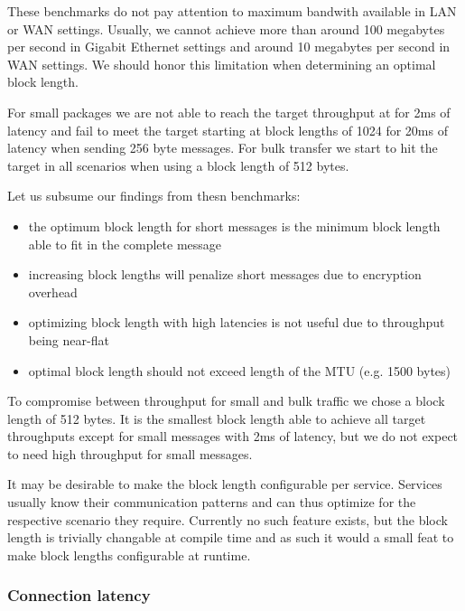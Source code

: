 \medskip

These benchmarks do not pay attention to maximum bandwith available in LAN or WAN settings.
Usually, we cannot achieve more than around 100 megabytes per second in Gigabit Ethernet settings and around 10 megabytes per second in WAN settings.
We should honor this limitation when determining an optimal block length.

For small packages we are not able to reach the target throughput at for 2ms of latency and fail to meet the target starting at block lengths of 1024 for 20ms of latency when sending 256 byte messages.
For bulk transfer we start to hit the target in all scenarios when using a block length of 512 bytes.

\medskip

Let us subsume our findings from thesn benchmarks:
\begin{itemize}
    \item the optimum block length for short messages is the minimum block length able to fit in the complete message
    \item increasing block lengths will penalize short messages due to encryption overhead
    \item optimizing block length with high latencies is not useful due to throughput being near-flat
    \item optimal block length should not exceed length of the MTU (e.g. 1500 bytes)
\end{itemize}

To compromise between throughput for small and bulk traffic we chose a block length of 512 bytes.
It is the smallest block length able to achieve all target throughputs except for small messages with 2ms of latency, but we do not expect to need high throughput for small messages.

It may be desirable to make the block length configurable per service.
Services usually know their communication patterns and can thus optimize for the respective scenario they require.
Currently no such feature exists, but the block length is trivially changable at compile time and as such it would a small feat to make block lengths configurable at runtime.

\subsubsection{Connection latency}

